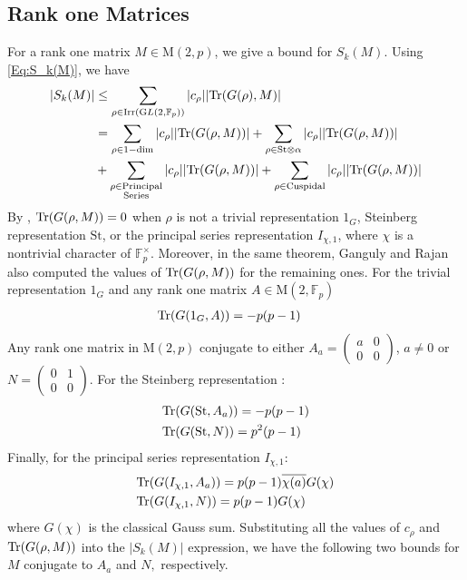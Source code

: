 \documentclass[12pt,reqno]{amsart}
\theoremstyle{plain}
\theoremstyle{definition}
\newcommand{\Tr}{{\rm Tr}}
\newcommand{\GL}{{\mathrm GL}}
\newcommand{\M}{\mathrm{M}}
\newcommand{\irr}{\mathrm{Irr}}
\theoremstyle{remark}
\newcommand{\FF}{\mathbb{F}}
\begin{document}
\subsection{Rank one Matrices}\label{subsec:rank one}
 For a rank one matrix $M \in \M(2,p)$, we  give a bound for $S_k(M)$.
 Using \cref{Eq:S_k(M)}, we have 
 \begin{align*}
     |S_k(M)| &\leq \sum_{\rho\in \irr(\GL(2, \FF_p))}|c_{\rho}||\Tr(G(\rho),M)| \\
     &= \sum_{\rho \in 1\mathrm{-dim}}|c_{\rho}||\Tr(G(\rho,M))| +  \sum_{\rho \in \mathrm{St \otimes \alpha}}|c_{\rho}||\Tr(G(\rho,M))| \\&+\sum_{\substack{\rho \in  \mathrm{Principal}\\ \mathrm{Series}}}|c_{\rho}||\Tr(G(\rho,M))| +\sum_{\rho \in \mathrm{Cuspidal}}|c_{\rho}||\Tr(G(\rho,M))|
\end{align*}
By \cite[Theorem 1.8]{ganguly2023singular}, $\Tr(G(\rho,M))=0$ when $\rho$ is not a trivial representation $1_G$, Steinberg representation $\mathrm{St}$, or the principal series representation $I_{\chi,1}$, where $\chi$ is a nontrivial character of $\FF_p^{\times}$. Moreover, in the same theorem, Ganguly and Rajan also computed the values of $\Tr(G(\rho,M))$ for the remaining ones. For the trivial representation $1_G$ and any rank one matrix $A \in \M(2, \FF_p)$
\begin{align*}
    &\Tr(G(1_G,A))= -p(p-1)
    \end{align*}
    Any rank one matrix in $\M(2,p)$ conjugate to either $A_a= \begin{pmatrix}
    a & 0 \\
    0 &0
\end{pmatrix}$, $a\neq 0$ or $N= \begin{pmatrix}
    0 &1\\
    0 &0
\end{pmatrix}$. For the Steinberg representation :
\begin{align*}
    &\Tr(G(\mathrm{St},A_a))= -p(p-1)\\
    &\Tr(G(\mathrm{St},N))= p^2(p-1)
\end{align*}
Finally, for the principal series representation $I_{\chi,1}$:
    \begin{align*}
    &\Tr(G(I_{\chi,1},A_a))= p(p-1)\overline{\chi(a)}G(\chi)\\
    &\Tr(G(I_{\chi,1},N))= p(p-1)G(\chi)
\end{align*}
where $G(\chi) $ is the classical Gauss sum.  
Substituting all the values of $c_\rho$ and $\Tr(G(\rho,M))$ into the $|S_k(M)|$ expression, we have the following two bounds for $M$ conjugate to $A_a$ and $N,$ respectively. 
\end{document}
